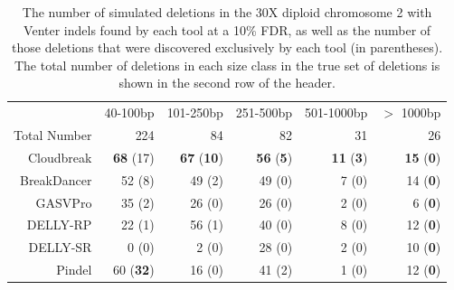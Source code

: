 \documentclass [11pt] {report}
\begin{document}
\begin{table}
\begin{center}
\begin{tabular}{rrrrrr}
 \hline
 & 40-100bp & 101-250bp & 251-500bp & 501-1000bp & $>$ 1000bp \\ 
 Total Number & 224 & 84 & 82 & 31 & 26\\ 
 \hline
 Cloudbreak & \textbf{68} (17) & \textbf{67} (\textbf{10}) & \textbf{56} (\textbf{5}) & \textbf{11} (\textbf{3}) & \textbf{15} (\textbf{0}) \\ 
 BreakDancer & 52 (8) & 49 (2) & 49 (0) & 7 (0) & 14 (\textbf{0}) \\ 
 GASVPro  & 35 (2) & 26 (0) & 26 (0) & 2 (0) & 6 (\textbf{0}) \\ 
 DELLY-RP  & 22 (1) & 56 (1) & 40 (0) & 8 (0) & 12 (\textbf{0}) \\ 
 DELLY-SR  & 0 (0) & 2 (0) & 28 (0) & 2 (0) & 10 (\textbf{0}) \\ 
 Pindel  & 60 (\textbf{32}) & 16 (0) & 41 (2) & 1 (0) & 12 (\textbf{0})\\ 
 \hline
\end{tabular}
\end{center}
\caption{The number of simulated deletions in the 30X diploid chromosome 2 with Venter indels found by each tool at a 10\% FDR, as well as the number of those deletions that were discovered exclusively by each tool (in parentheses). The total number of deletions in each size class in the true set of deletions is shown in the second row of the header.}
\label{chr2DeletionPredsFDR10}
\end{table}
\end{document}
